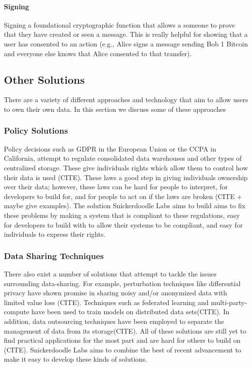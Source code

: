 \paragraph{Signing}
Signing a foundational cryptographic function that allows a someone to prove that they have created or seen a message. This is really helpful for showing that a user has consented to an action (e.g., Alice signs a message sending Bob 1 Bitcoin and everyone else knows that Alice consented to that transfer).


\subsection{Other Solutions}
There are a variety of different approaches and technology that aim to allow users to own their own data. In this section we discuss some of these approaches
\subsubsection{Policy Solutions}
Policy decisions such as GDPR in the European Union or the CCPA in California, attempt to regulate consolidated data warehouses and other types of centralized storage. These give individuals rights which allow them to control how their data is used (CITE). These laws a good step in giving individuals ownership over their data; however, these laws can be hard for people to interpret, for developers to build for, and for people to act on if the laws are broken (CITE + maybe give examples). The solution Snickerdoodle Labs aims to build aims to fix these problems by making a system that is compliant to these regulations, easy for developers to build with to allow their systems to be compliant, and easy for individuals to express their rights.


\subsubsection{Data Sharing Techniques}
There also exist a number of solutions that attempt to tackle the issues surrounding data-sharing. For example, perturbation techniques like differential privacy have shown promise in sharing noisy and/or anonymized data with limited value loss (CITE). Techniques such as federated learning and  multi-party-compute have been used to train models on distributed data sets(CITE). In addition, data outsourcing techniques have been employed to separate the management of data from its storage(CITE). All of these solutions are still yet to find practical applications for the most part and are hard for others to build on (CITE). Snickerdoodle Labs aims to combine the best of recent advancement to make it easy to develop these kinds of solutions. 

